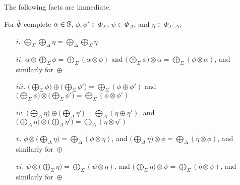 \noindent 
The following facts are immediate.
%
\begin{lemma}
For $\bar\Phi$ complete %
$\alpha \in \mathbb{S}$,
$\phi, \phi' \in \Phi_{\Sigma}$,
$\psi \in \Phi_{\Delta}$, and
$\eta \in \Phi_{\Sigma, \Delta}$:
%
\begin{enumerate}
\item[$i.$]
\( \bigoplus_{\Sigma}\bigoplus_{\Delta} \eta = \bigoplus_{\Delta}\bigoplus_{\Sigma} \eta \)
\item[$ii.$] 
\( \alpha \otimes \bigoplus_{\Sigma} \phi = \bigoplus_{\Sigma} (\alpha \otimes \phi) \) and
\( \bigl( \bigoplus_{\Sigma} \phi \bigr) \otimes\alpha = \bigoplus_{\Sigma} (\phi \otimes \alpha) \),
and similarly for~$\oplus$
\item[$iii.$]
\( \bigl(\bigoplus_{\Sigma} \phi\bigr) \oplus \bigl(\bigoplus_{\Sigma} \phi'\bigr) 
   = \bigoplus_{\Sigma} (\phi \oplus \phi') \) and
\( \bigl(\bigoplus_{\Sigma} \phi\bigr) \otimes \bigl(\bigoplus_{\Sigma} \phi'\bigr) 
   = \bigoplus_{\Sigma} (\phi \otimes \phi') \)
\item[$iv.$] 
\( \bigl(\bigoplus_{\Delta} \eta\bigr) \oplus \bigl(\bigoplus_{\Delta} \eta' \bigr) = 
 \bigoplus_{\Delta} (\eta \oplus \eta') \), and
\( \bigl(\bigoplus_{\Delta} \eta\bigr) \otimes \bigl(\bigoplus_{\Delta} \eta' \bigr) = 
 \bigoplus_{\Delta} (\eta \otimes \eta') \)
\item[$v.$] 
\( \phi \otimes \bigl(\bigoplus_{\Delta} \eta\bigr) = \bigoplus_{\Delta} (\phi \otimes \eta) \), and
\( \bigl(\bigoplus_{\Delta} \eta\bigr) \otimes \phi = \bigoplus_{\Delta} (\eta \otimes \phi) \),
and similarly for~$\oplus$
\item[$vi.$] 
\( \psi \otimes \bigl(\bigoplus_{\Sigma} \eta\bigr) = \bigoplus_{\Sigma} (\psi \otimes \eta) \), and
\( \bigl(\bigoplus_{\Sigma} \eta\bigr) \otimes \psi = \bigoplus_{\Sigma} (\eta \otimes \psi) \),
and similarly for~$\oplus$
\end{enumerate}
\end{lemma}


